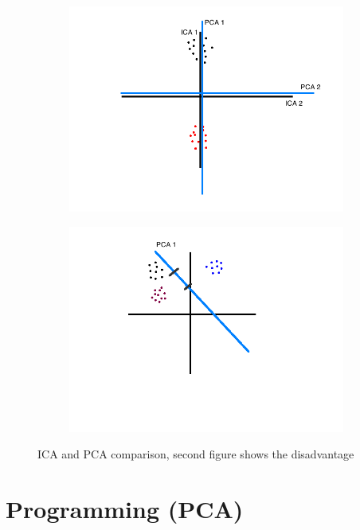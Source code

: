 \documentclass[paper=a4, fontsize=11pt]{scrartcl} %
\numberwithin{equation}{section} %
\numberwithin{figure}{section} %
\numberwithin{table}{section} %
\begin{document}
\begin{figure}[!htbp]
\centering
\begin{subfigure}{.5\textwidth}
  \centering
  \includegraphics[width=.6\linewidth]{../figures/ica-pca1.png}
  \label{fig:sub1}
\end{subfigure}%
\begin{subfigure}{.5\textwidth}
  \centering
  \includegraphics[width=.8\linewidth]{../figures/ica-pca2.png}
  \label{fig:sub2}
\end{subfigure}
\caption{ICA and PCA comparison, second figure shows the disadvantage}
\label{fig:test}
\end{figure}





\newpage
\section{Programming (PCA)}
\subsection{}
\subsection{}
\end{document}
